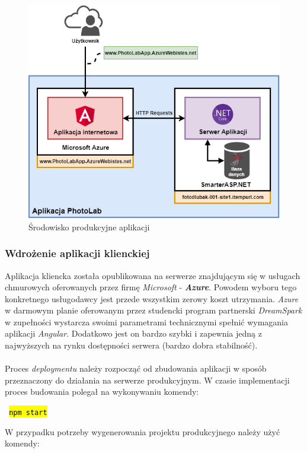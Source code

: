 \begin{figure}[ht]
	\centering
	\includegraphics[width=0.8\linewidth]{graphics/chapter-4/production-server.png}
	\caption{Środowisko produkcyjne aplikacji}
	\label{fig:production-server}
\end{figure}

\subsubsection{Wdrożenie aplikacji klienckiej}
\quad Aplikacja kliencka została opublikowana na serwerze znajdującym się w usługach chmurowych oferowanych przez firmę \textit{Microsoft} - \textbf{\textit{Azure}}. Powodem wyboru tego konkretnego usługodawcy jest przede wszystkim zerowy koszt utrzymania. \textit{Azure} w darmowym planie oferowanym przez studencki program partnerski \textit{DreamSpark} w zupełności wystarcza swoimi parametrami technicznymi spełnić wymagania aplikacji \textit{Angular}. Dodatkowo jest on bardzo szybki i zapewnia jedną z najwyższych na rynku dostępności serwera (bardzo dobra stabilność).\\
\\
Proces \textit{deploymentu} należy rozpocząć od zbudowania aplikacji w sposób przeznaczony do działania na serwerze produkcyjnym. W czasie implementacji proces budowania polegał na wykonywaniu komendy:

\vspace{2mm}

    \centerline{\texttt{\hl{ npm start }}}

\vspace{2mm}

\noindent W przypadku potrzeby wygenerowania projektu produkcyjnego należy użyć komendy:

